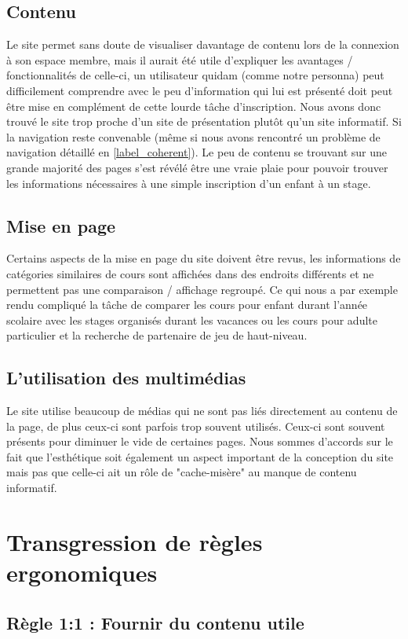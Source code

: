 \documentclass{article}[12pt]
\begin{document}
\subsection{Contenu}
Le site permet sans doute de visualiser davantage de contenu lors de la connexion à son espace membre, mais il aurait été utile d'expliquer les avantages / fonctionnalités de celle-ci, un utilisateur quidam (comme notre personna) peut difficilement comprendre avec le peu d'information qui lui est présenté doit peut être mise en complément de cette lourde tâche d'inscription. Nous avons donc trouvé le site trop proche d'un site de présentation plutôt qu'un site informatif. Si la navigation reste convenable (même si nous avons rencontré un problème de navigation détaillé en \ref{label_coherent}). Le peu de contenu se trouvant sur une grande majorité des pages s'est révélé être une vraie plaie pour pouvoir trouver les informations nécessaires à une simple inscription d'un enfant à un stage.
\subsection{Mise en page}
Certains aspects de la mise en page du site doivent être revus, les informations de catégories similaires de cours sont affichées dans des endroits différents et ne permettent pas une comparaison / affichage regroupé. Ce qui nous a par exemple rendu compliqué la tâche de comparer les cours pour enfant durant l'année scolaire avec les stages organisés durant les vacances ou les cours pour adulte particulier et la recherche de partenaire de jeu de haut-niveau.
\subsection{L'utilisation des multimédias }
Le site utilise beaucoup de médias qui ne sont pas liés directement au contenu de la page, de plus ceux-ci sont parfois trop souvent utilisés. Ceux-ci sont souvent présents pour diminuer le vide de certaines pages. Nous sommes d'accords sur le fait que l'esthétique soit également un aspect important de la conception du site mais pas que celle-ci ait un rôle de "cache-misère" au manque de contenu informatif. 

\newpage
\section{Transgression de règles ergonomiques}
	\subsection{Règle 1:1 : Fournir du contenu utile }
\end{document}
